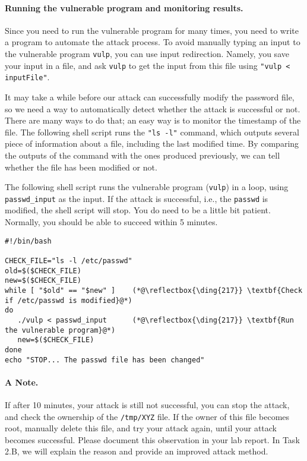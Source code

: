 \paragraph{Running the vulnerable program and monitoring results.}
Since you need to run the vulnerable program for many
times, you need to write a program to automate the attack process. 
To avoid manually typing an input to the vulnerable program \texttt{vulp}, you can use 
input redirection. Namely, you save your input in a file, and ask
\texttt{vulp} to get the input from this file using \texttt{"vulp <
inputFile"}.

It may take a while before our attack can successfully modify the
password file, so we need a way to automatically detect whether the attack is
successful or not. There are many ways to do that; an easy way 
is to monitor the timestamp of the file.
The following shell script runs the \texttt{"ls -l"} command, which
outputs several piece of information about a
file, including the last modified time. By comparing the outputs of the
command with the ones produced previously, we can tell
whether the file has been modified or not. 


The following shell script runs the vulnerable program (\texttt{vulp}) in a loop,
using \texttt{passwd\_input} as the input. If the attack is successful, i.e.,
the \texttt{passwd} is modified, the shell script will stop. 
You do need to be a little bit patient. 
Normally, you should be able to succeed within 5 minutes. 



\begin{lstlisting}
#!/bin/bash

CHECK_FILE="ls -l /etc/passwd"
old=$($CHECK_FILE)
new=$($CHECK_FILE)
while [ "$old" == "$new" ]    (*@\reflectbox{\ding{217}} \textbf{Check if /etc/passwd is modified}@*)
do
   ./vulp < passwd_input      (*@\reflectbox{\ding{217}} \textbf{Run the vulnerable program}@*)
   new=$($CHECK_FILE)
done
echo "STOP... The passwd file has been changed"
\end{lstlisting}



\paragraph{A Note.}
If after 10 minutes, your attack is still not 
successful, you can stop the attack, and check the ownership
of the \texttt{/tmp/XYZ} file. If the owner of this file
becomes root, manually delete this file, and try your 
attack again, until your attack becomes successful. 
Please document this observation in your lab report. 
In Task 2.B, we will explain the reason and provide
an improved attack method. 



